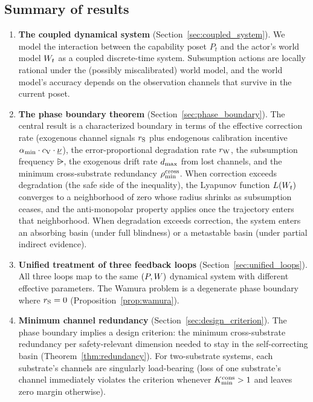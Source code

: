 \subsection{Summary of results}

\begin{enumerate}
\item \textbf{The coupled dynamical system}
  (Section~\ref{sec:coupled_system}).
  We model the interaction between the capability poset $P_t$ and the
  actor's world model $W_t$ as a coupled discrete-time system.
  Subsumption actions are locally rational under the (possibly
  miscalibrated) world model, and the world model's accuracy depends
  on the observation channels that survive in the current poset.

\item \textbf{The phase boundary theorem}
  (Section~\ref{sec:phase_boundary}).
  The central result is a characterized boundary in terms of the
  effective correction rate (exogenous channel signals $r_{\mathrm{S}}$ plus
  endogenous calibration incentive $\alpha_{\min} \cdot c_{\mathrm{V}}
  \cdot \underline{\nu}$),
  the error-proportional degradation rate $r_{\mathrm{W}}$, the subsumption
  frequency $\rsub$, the exogenous drift rate $d_{\mathrm{max}}$ from lost
  channels, and the minimum cross-substrate redundancy
  $\rho_{\min}^{\mathrm{cross}}$.  When correction exceeds degradation (the safe
  side of the inequality), the Lyapunov function $L(W_t)$
  converges to a neighborhood of zero whose radius shrinks as
  subsumption ceases, and the anti-monopolar property applies once
  the trajectory enters that neighborhood.  When degradation exceeds
  correction, the system enters an absorbing basin (under full
  blindness) or a metastable basin (under partial indirect evidence).

\item \textbf{Unified treatment of three feedback loops}
  (Section~\ref{sec:unified_loops}).
  All three loops map to the same $(P, W)$ dynamical system with
  different effective parameters.  The Wamura problem is a degenerate
  phase boundary where $r_{\mathrm{S}} = 0$ (Proposition~\ref{prop:wamura}).

\item \textbf{Minimum channel redundancy}
  (Section~\ref{sec:design_criterion}).
  The phase boundary implies a design criterion: the minimum
  cross-substrate redundancy per safety-relevant dimension needed to
  stay in the self-correcting basin (Theorem~\ref{thm:redundancy}).
  For two-substrate systems, each substrate's channels are singularly
  load-bearing (loss of one substrate's channel immediately violates
  the criterion whenever $K_{\mathrm{min}}^{\mathrm{cons}} > 1$ and leaves zero margin
  otherwise).
\end{enumerate}

